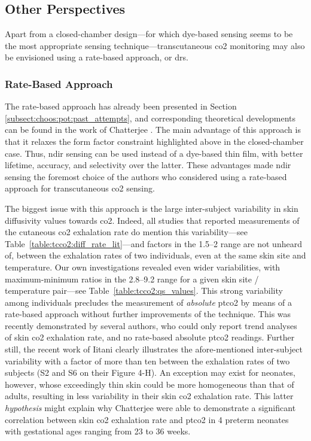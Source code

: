 \subsection{Other Perspectives}

Apart from a closed-chamber design---for which dye-based sensing seems to be the most appropriate sensing technique---transcutaneous \gls{co2} monitoring may also be envisioned using a rate-based approach, or \gls{drs}.

\subsubsection{Rate-Based Approach}\label{subsect:choos:pot:rate_based}

The rate-based approach has already been presented in Section \ref{subsect:choos:pot:past_attempts}, and corresponding theoretical developments can be found in the work of Chatterjee \etal{}\cite{chatterjee2015}. The main advantage of this approach is that it relaxes the form factor constraint highlighted above in the closed-chamber case. Thus, \gls{ndir} sensing can be used instead of a dye-based thin film, with better lifetime, accuracy, and selectivity over the latter. These advantages made \gls{ndir} sensing the foremost choice of the authors who considered using a rate-based approach for transcutaneous \gls{co2} sensing\cite{chatterjee2014, chatterjee2015, ge2018, grangeat2019, grangeat2020}.

The biggest issue with this approach is the large inter-subject variability in skin diffusivity values towards \gls{co2}. Indeed, all studies that reported measurements of the cutaneous \gls{co2} exhalation rate do mention this variability---see Table~\ref{table:tcco2:diff_rate_lit}---and factors in the 1.5--2 range are not unheard of, between the exhalation rates of two individuals, even at the same skin site and temperature. Our own investigations revealed even wider variabilities, with maximum-minimum ratios in the 2.8--9.2 range for a given skin site / temperature pair---see Table~\ref{table:tcco2:qs_values}. This strong variability among individuals precludes the measurement of \emph{absolute} \gls{ptco2} by means of a rate-based approach without further improvements of the technique. This was recently demonstrated by several authors, who could only report trend analyses of skin \gls{co2} exhalation rate, and no rate-based absolute \gls{ptco2} readings\cite{ge2018, grangeat2019, grangeat2020}. Further still, the recent work of Iitani \etal{}\cite{iitani2021} clearly illustrates the afore-mentioned inter-subject variability with a factor of more than ten between the exhalation rates of two subjects (S2 and S6 on their Figure 4-H). An exception may exist for neonates, however, whose exceedingly thin skin could be more homogeneous than that of adults, resulting in less variability in their skin \gls{co2} exhalation rate. This latter \emph{hypothesis} might explain why Chatterjee \etal{}\cite{chatterjee2015} were able to demonstrate a significant correlation between skin \gls{co2} exhalation rate and \gls{ptco2} in 4 preterm neonates with gestational ages ranging from 23 to 36 weeks.

